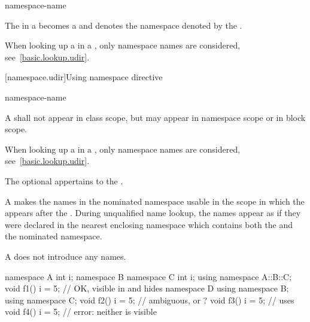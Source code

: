 \begin{bnf}
\br
     namespace-name
\end{bnf}

\pnum
The  in a 
becomes a  and denotes the namespace denoted by the
.
\begin{note}
When looking up a  in a
, only namespace names are
considered, see~\ref{basic.lookup.udir}.
\end{note}

[namespace.udir]{Using namespace directive}%

\begin{bnf}
\br
        namespace-name \terminal{;}
\end{bnf}

\pnum
A  shall not appear in class scope, but may
appear in namespace scope or in block scope.
\begin{note}
When looking up a  in a
, only namespace names are considered,
see~\ref{basic.lookup.udir}.
\end{note}
The optional  appertains to the .

\pnum
\begin{note}
A  makes the names in the nominated
namespace usable in the scope in which the
 appears after
the .
During unqualified name lookup, the names
appear as if they were declared in the nearest enclosing namespace which
contains both the  and the nominated
namespace.
\end{note}

\pnum
\begin{note}
A  does not introduce any names.
\end{note}
\begin{example}
\begin{codeblock}
namespace A {
  int i;
  namespace B {
    namespace C {
      int i;
    }
    using namespace A::B::C;
    void f1() {
      i = 5;        // OK,  visible in  and hides 
    }
  }
  namespace D {
    using namespace B;
    using namespace C;
    void f2() {
      i = 5;        // ambiguous,  or ?
    }
  }
  void f3() {
    i = 5;          // uses 
  }
}
void f4() {
  i = 5;            // error: neither  is visible
}
\end{codeblock}
\end{example}

